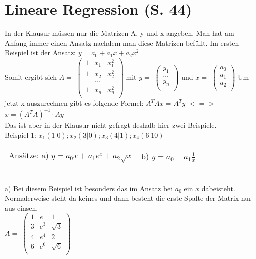 \documentclass[a4paper, 11pt]{article}
\begin{document}
\section{Lineare Regression (S. 44)}
In der Klausur müssen nur die Matrizen A, y und x angeben. Man hat am Anfang
immer einen Ansatz nachdem man diese Matrizen befüllt.\newline
Im ersten Beispiel ist der Ansatz: $y=a_0 + a_1x+a_2x^2$ \\
\newline Somit ergibt sich $A=$
$\begin{pmatrix}
	1 & x_1 & x_1^2\\
	1 & x_2 & x_2^2\\
	  & \ldots &  \\
	1 & x_n & x_n^2\\
\end{pmatrix}$
mit $y=$
$\begin{pmatrix}
	y_1\\
	\ldots\\
	y_n\\
\end{pmatrix}$
und $x=$
$\begin{pmatrix}
	a_0\\
	a_1\\
	a_2\\
\end{pmatrix}$
\newline Um jetzt x auszurechnen gibt es folgende Formel: $A^TAx = A^Ty$ $<=>$
$x=(A^TA)^{-1} \cdot Ay$\\
Das ist aber in der Klausur nicht gefragt deshalb hier zwei Beispiele. \\
\newline Beispiel 1: $x_1(1|0); x_2(3|0); x_3(4|1); x_4(6|10)$ \\
\setlength{\tabcolsep}{10pt}
\newline \begin{tabular}{l r}
	Ansätze: a) $y=a_0x+a_1e^x+a_2\sqrt{x}$ & b) $y=a_0 +a_1\frac{1}{x}$
\end{tabular} \\
\newline a) Bei diesem Beispiel ist besonders das im Ansatz bei $a_0$ ein $x$
dabeisteht. Normalerweise steht da keines und dann besteht die erste Spalte der
Matrix nur aus einsen.\\
 \newline $A=$ $\begin{pmatrix}
	1 & e & 1\\
	3 & e^3 & \sqrt{3}\\
	4 & e^4 & 2\\
	6 & e^6 & \sqrt{6}\\ 
\end{pmatrix}$
\end{document}
